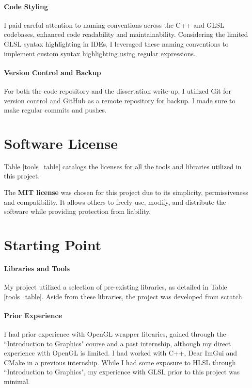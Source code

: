 \paragraph{Code Styling}
I paid careful attention to naming conventions across the C++ and GLSL codebases, enhanced code readability and maintainability. Considering the limited GLSL syntax highlighting in IDEs, I leveraged these naming conventions to implement custom syntax highlighting using regular expressions.

\paragraph{Version Control and Backup}
For both the code repository and the dissertation write-up, I utilized Git for version control and GitHub as a remote repository for backup. I made sure to make regular commits and pushes.

\section{Software License}
\label{sec:License}

Table \ref{tools_table} catalogs the licenses for all the tools and libraries utilized in this project.

The \textbf{MIT license} was chosen for this project due to its simplicity, permissiveness and compatibility. It allows others to freely use, modify, and distribute the software while providing protection from liability.


\section{Starting Point}
\label{sec:Starting Point}

\paragraph{Libraries and Tools}
My project utilized a selection of pre-existing libraries, as detailed in Table \ref{tools_table}. Aside from these libraries, the project was developed from scratch. 

\paragraph{Prior Experience}
I had prior experience with OpenGL wrapper libraries, gained through the ``Introduction to Graphics" course and a past internship, although my direct experience with OpenGL is limited. I had worked with C++, Dear ImGui and CMake in a previous internship. While I had some exposure to HLSL through ``Introduction to Graphics", my experience with GLSL prior to this project was minimal.

